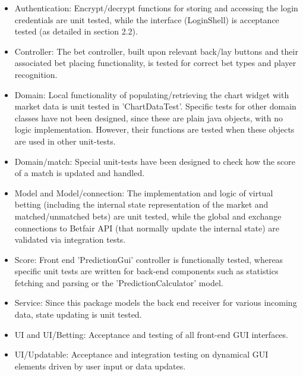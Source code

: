 \documentclass[10pt]{article}
\begin{document}
\begin{itemize}
\renewcommand{\labelitemi}{$\bullet$}
\item Authentication: Encrypt/decrypt functions for storing and accessing the login credentials are unit tested, while the interface (LoginShell) is acceptance tested (as detailed in section 2.2).
\item Controller: The bet controller, built upon relevant back/lay buttons and their associated bet placing functionality, is tested for correct bet types and player recognition.
\item Domain: Local functionality of populating/retrieving the chart widget with market data is unit tested in 'ChartDataTest'. Specific tests for other domain classes have not been designed, since these are plain java objects, with no logic implementation. However, their functions are tested when these objects are used in other unit-tests.
\item Domain/match: Special unit-tests have been designed to check how the score of a match is updated and handled.
\item Model and Model/connection: The implementation and logic of virtual betting (including the internal state representation of the market and matched/unmatched bets) are unit tested, while the global and exchange connections to Betfair API (that normally update the internal state) are validated via integration tests.     
\item Score: Front end 'PredictionGui' controller is functionally tested, whereas specific unit tests are written for back-end components such as statistics fetching and parsing or the 'PredictionCalculator' model. 
\item Service: Since this package models the back end receiver for various incoming data, state updating is unit tested.
\item UI and UI/Betting: Acceptance and testing of all front-end GUI interfaces.
\item UI/Updatable: Acceptance and integration testing on dynamical GUI elements driven by user input or data updates.
\end{itemize}
\end{document}
